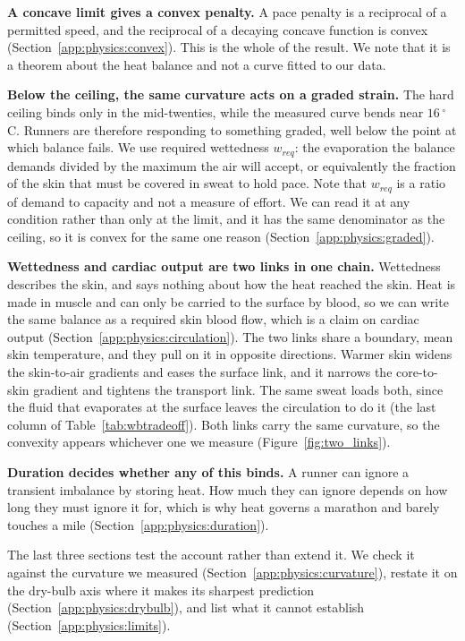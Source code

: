 \textbf{A concave limit gives a convex penalty.} A pace penalty is a reciprocal
of a permitted speed, and the reciprocal of a decaying concave function is
convex (Section~\ref{app:physics:convex}). This is the whole of the result. We
note that it is a theorem about the heat balance and not a curve fitted to our
data.

\textbf{Below the ceiling, the same curvature acts on a graded strain.} The hard
ceiling binds only in the mid-twenties, while the measured curve bends near
$16\,^{\circ}$C. Runners are therefore responding to something graded, well
below the point at which balance fails. We use required wettedness $w_{req}$:
the evaporation the balance demands divided by the maximum the air will accept,
or equivalently the fraction of the skin that must be covered in sweat to hold
pace. Note that $w_{req}$ is a ratio of demand to capacity and not a measure of
effort. We can read it at any condition rather than only at the limit, and it
has the same denominator as the ceiling, so it is convex for the same one
reason (Section~\ref{app:physics:graded}).

\textbf{Wettedness and cardiac output are two links in one chain.} Wettedness
describes the skin, and says nothing about how the heat reached the skin. Heat
is made in muscle and can only be carried to the surface by blood, so we can
write the same balance as a required skin blood flow, which is a claim on
cardiac output (Section~\ref{app:physics:circulation}). The two links share a
boundary, mean skin temperature, and they pull on it in opposite directions.
Warmer skin widens the skin-to-air gradients and eases the surface link, and it
narrows the core-to-skin gradient and tightens the transport link. The same
sweat loads both, since the fluid that evaporates at the surface leaves the
circulation to do it (the last column of Table~\ref{tab:wbtradeoff}). Both
links carry the same curvature, so the convexity appears whichever one we
measure (Figure~\ref{fig:two_links}).

\textbf{Duration decides whether any of this binds.} A runner can ignore a
transient imbalance by storing heat. How much they can ignore depends on how
long they must ignore it for, which is why heat governs a marathon and barely
touches a mile (Section~\ref{app:physics:duration}).

The last three sections test the account rather than extend it. We check it
against the curvature we measured (Section~\ref{app:physics:curvature}), restate
it on the dry-bulb axis where it makes its sharpest prediction
(Section~\ref{app:physics:drybulb}), and list what it cannot establish
(Section~\ref{app:physics:limits}).


